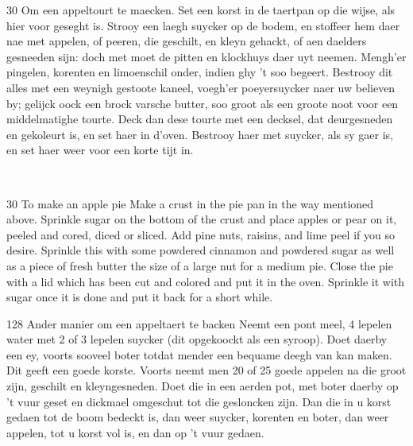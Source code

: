 \documentclass[a4paper]{article}
\begin{document}
\medskip
\begin{minipage}{.45\textwidth}	
30 Om een appeltourt te maecken.
Set een korst in de taertpan op die wijse, als hier voor geseght is. 
Strooy een laegh suycker op de bodem, en stoffeer hem daer nae met appelen, 
of peeren, die geschilt, en kleyn gehackt, of aen daelders gesneeden sijn: 
doch met moet de pitten en klockhuys daer uyt neemen. Mengh’er pingelen, 
korenten en limoenschil onder, indien ghy ’t soo begeert. 
Bestrooy dit alles met een weynigh gestoote kaneel, voegh’er poeyersuycker naer 
uw believen by; gelijck oock een brock varsche butter, soo groot als een groote 
noot voor een middelmatighe tourte. Deck dan dese tourte met een decksel, 
dat deurgesneden en gekoleurt is, en set haer in d’oven. Bestrooy haer met suycker, 
als sy gaer is, en set haer weer voor een korte tijt in. \cite{hp}
\end{minipage}
\begin{minipage}{0.05\textwidth}
\ \ \ 
\end{minipage}
\begin{minipage}{.45\textwidth}
30 To make an apple pie
Make a crust in the pie pan in the way mentioned above. Sprinkle sugar on the bottom of the crust and place apples or pear on it, peeled and cored, diced or sliced. Add pine nuts, raisins, and lime peel if you so desire.
Sprinkle this with some powdered cinnamon and powdered sugar as well as a piece of fresh butter the size of a large nut for a medium pie. Close the pie with a lid which has been cut and colored and put it in the oven. Sprinkle it with sugar once it is done and put it back for a short while. 
\end{minipage}

\medskip
\begin{minipage}{.45\textwidth}
128 Ander manier om een appeltaert te backen 
Neemt een pont meel, 4 lepelen water met 2 of 3 lepelen suycker (dit opgekoockt als een syroop). Doet daerby een ey, voorts sooveel boter totdat mender een bequame deegh van kan maken. Dit geeft een goede korste. Voorts neemt men 20 of 25 goede appelen na die groot zijn, geschilt en kleyngesneden. Doet die in een aerden pot, met boter daerby op 't vuur geset en dickmael omgeschut tot die gesloncken zijn. Dan die in u korst gedaen tot de boom bedeckt is, dan weer suycker, korenten en boter, dan weer appelen, tot u korst vol is, en dan op 't vuur gedaen. \cite{vk}
\end{minipage}
\begin{minipage}{0.05\textwidth}
\ \ \ 
\end{minipage}
\begin{minipage}{.45\textwidth}
\end{minipage}
\end{document}
